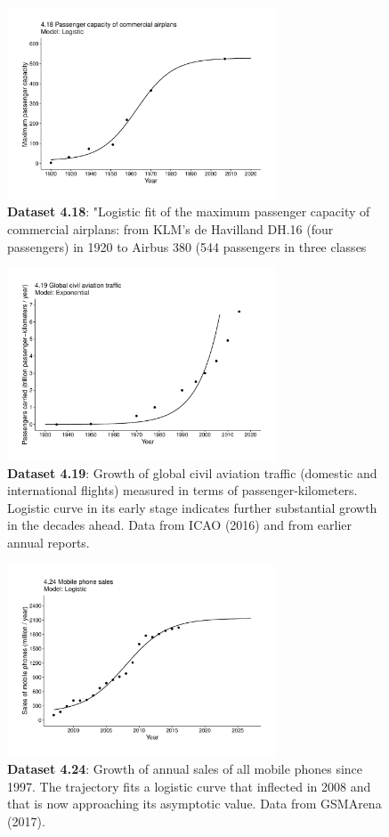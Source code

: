 \documentclass[aps,rmp,preprint,superscriptaddress,10pt,onecolumn]{article}
\begin{document}
\begin{figure}[h]
\includegraphics[width=8cm]{output/figs-ggplot/4.18.pdf}
\caption{\textbf{Dataset 4.18}: "Logistic fit of the maximum passenger capacity of commercial airplans: from KLM's de Havilland DH.16 (four passengers) in 1920 to Airbus 380 (544 passengers in three classes}
\end{figure}
	
\begin{figure}[h]
\includegraphics[width=8cm]{output/figs-ggplot/4.19.pdf}
\caption{\textbf{Dataset 4.19}: Growth of global civil aviation traffic (domestic and international flights) measured in terms of passenger-kilometers. Logistic curve in its early stage indicates further substantial growth in the decades ahead. Data from ICAO (2016) and from earlier annual reports. }
\end{figure}
	
\begin{figure}[h]
\includegraphics[width=8cm]{output/figs-ggplot/4.24.pdf}
\caption{\textbf{Dataset 4.24}: Growth of annual sales of all mobile phones since 1997. The trajectory fits a logistic curve that inflected in 2008 and that is now approaching its asymptotic value. Data from GSMArena (2017).}
\end{figure}
	
\end{document}
